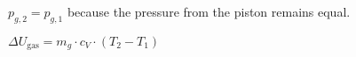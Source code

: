 \( p_{g,2} = p_{g,1} \) because the pressure from the piston remains equal.  

\( \Delta U_{\text{gas}} = m_g \cdot c_V \cdot (T_2 - T_1) \)